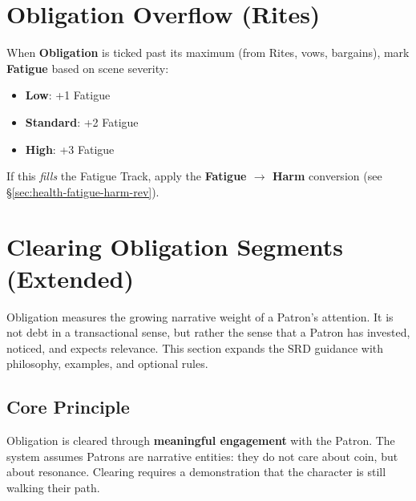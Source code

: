 \section{Obligation Overflow (Rites)}
\label{sec:obligation-overflow}

When \textbf{Obligation} is ticked past its maximum (from Rites, vows, bargains), mark \textbf{Fatigue} based on scene severity:
\begin{itemize}
  \item \textbf{Low}: +1 Fatigue
  \item \textbf{Standard}: +2 Fatigue
  \item \textbf{High}: +3 Fatigue
\end{itemize}
If this \emph{fills} the Fatigue Track, apply the \textbf{Fatigue $\rightarrow$ Harm} conversion (see \S\ref{sec:health-fatigue-harm-rev}).


\section{Clearing Obligation Segments (Extended)}\label{sec:obligation-clearing-extended}

Obligation measures the growing narrative weight of a Patron’s attention. It is not debt in a transactional sense, but rather the sense that a Patron has invested, noticed, and expects relevance. This section expands the SRD guidance with philosophy, examples, and optional rules.

\subsection{Core Principle}\label{subsec:obligation-principle}
Obligation is cleared through \textbf{meaningful engagement} with the Patron. The system assumes Patrons are narrative entities: they do not care about coin, but about resonance. Clearing requires a demonstration that the character is still walking their path.

